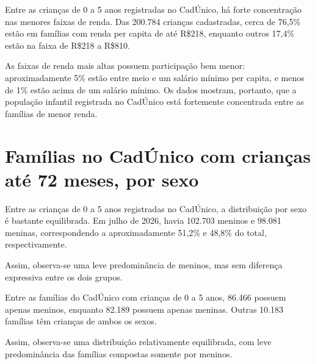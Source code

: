 Entre as crianças de 0 a 5 anos registradas no CadÚnico, há forte concentração nas menores faixas de renda. Das 200.784 crianças cadastradas, cerca de 76,5\% estão em famílias com renda per capita de até R\$218, enquanto outros 17,4\% estão na faixa de R\$218 a R\$810.

As faixas de renda mais altas possuem participação bem menor: aproximadamente 5\% estão entre meio e um salário mínimo per capita, e menos de 1\% estão acima de um salário mínimo. Os dados mostram, portanto, que a população infantil registrada no CadÚnico está fortemente concentrada entre as famílias de menor renda.


\section{Famílias no CadÚnico com crianças até 72 meses, por sexo}


Entre as crianças de 0 a 5 anos registradas no CadÚnico, a distribuição por sexo é bastante equilibrada. Em julho de 2026, havia 102.703 meninos e 98.081 meninas, correspondendo a aproximadamente 51,2\% e 48,8\% do total, respectivamente.

Assim, observa-se uma leve predominância de meninos, mas sem diferença expressiva entre os dois grupos.


Entre as famílias do CadÚnico com crianças de 0 a 5 anos, 86.466 possuem apenas meninos, enquanto 82.189 possuem apenas meninas. Outras 10.183 famílias têm crianças de ambos os sexos.

Assim, observa-se uma distribuição relativamente equilibrada, com leve predominância das famílias compostas somente por meninos.


